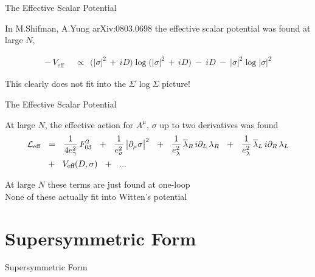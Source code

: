 \documentclass{beamer}
\begin{document}
\begin{frame}{The Effective Scalar Potential}

	In {\sc M.Shifman, A.Yung arXiv:0803.0698} the effective scalar potential
	was found at large $ N $,

\begin{align*}
%
	-\,V_\text{eff}  &  ~~\propto~~    
		\big( \big|\sigma\big|^2 \,+\, iD \big) 
		\log \big( \big|\sigma\big|^2 \,+\, iD \big)
		~-~
		iD
		~-~
		\big|\sigma\big|^2 \log \big|\sigma\big|^2
\end{align*}

	This clearly does not fit into the $ \Sigma \, \log \Sigma $ picture!

\end{frame}


\begin{frame}{The Effective Scalar Potential}

	At large $ N $, the effective action for $ A^\mu $, $ \sigma $
	up to two derivatives was found
\begin{align*}
%
	\mc{L}_\text{eff}  & ~~=~~  
		\frac{1}{4e_\gamma^2}\,F_{03}^2  ~~+~~  \frac{1}{e_\sigma^2}\,\big|\p_\mu\sigma\big|^2
		~~+~~ \frac{1}{e_\lambda^2}\,\ov{\lambda}{}_R\, i\p_L\, \lambda_R
		~~+~~ \frac{1}{e_\lambda^2}\,\ov{\lambda}{}_L\, i\p_R\, \lambda_L
		\\
%
		&
		~~+~~ V_\text{eff}(D, \sigma)
                ~~+~~ ...
\end{align*}

	At large $ N $ these terms are just found at one-loop\\[4mm]

	None of these actually fit into Witten's potential
\end{frame}




\section{Supersymmetric Form}
\begin{frame}{}
\fontsize{50pt}{50pt}\selectfont
\begin{center}
        Supersymmetric Form
\end{center}
\end{frame}
\end{document}
